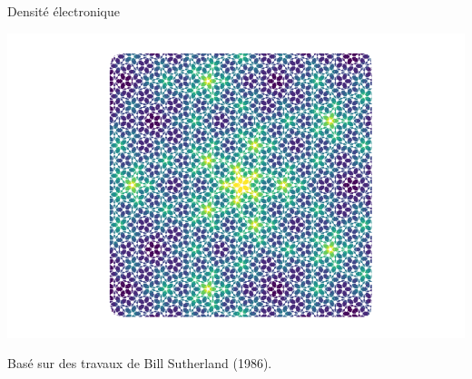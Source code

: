 \documentclass[xcolor=x11names,compress,professionalfonts]{beamer}
\renewcommand{\(}{\begin{columns}}
\renewcommand{\)}{\end{columns}}
\newcommand{\<}[1]{\begin{column}{#1}}
\renewcommand{\>}{\end{column}}
\begin{document}
\begin{frame}{Densité électronique}
{\centering
\includegraphics[width=.9\textwidth]{img/electronic_density.pdf}

}

Basé sur des travaux de Bill Sutherland (1986).
\end{frame}
\end{document}
